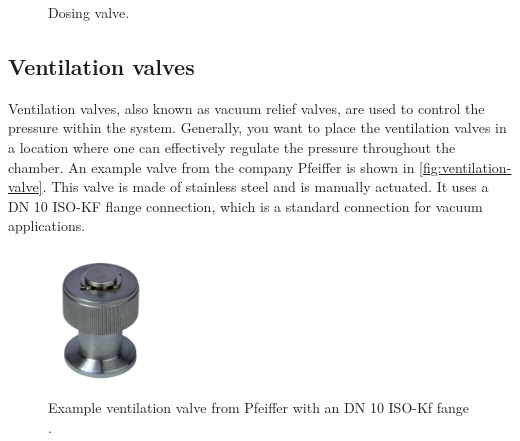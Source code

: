 \begin{figure}[H]
\begin{subfigure}[t]{0.49\textwidth}
        \label{fig:dosing-valve_real}
    \end{subfigure}
    \caption{Dosing valve.}
    \label{fig:dosing-valve}
\end{figure}

\subsection{Ventilation valves}
Ventilation valves, also known as vacuum relief valves, are used to control the pressure within the system.
Generally, you want to place the ventilation valves in a location where one can effectively regulate the pressure throughout the chamber.
An example valve from the company Pfeiffer is shown in \autoref{fig:ventilation-valve}.
This valve is made of stainless steel and is manually actuated.
It uses a DN 10 ISO-KF flange connection, which is a standard connection for vacuum applications.

\begin{figure}[H]
    \centering
    \includegraphics[width=0.3\textwidth]{sections/imges/ports/venting_valve.png}
    \caption{Example ventilation valve from Pfeiffer with an DN 10 ISO-Kf fange \cite{pfeiffer_venting_valve}.}
    \label{fig:ventilation-valve}
\end{figure}



